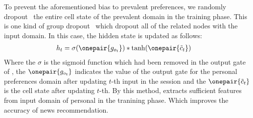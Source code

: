 To prevent the aforementioned bias to prevalent preferences, we randomly dropout~\cite{Dropout} the entire cell state of the prevalent domain in the training phase.
This is one kind of group dropout~\cite{GroupDropout} which dropout all of the related nodes with the input domain.
In this case, the hidden state is updated as follows:
\begin{align*}
	h_t &= \sigma(\onepair{g_{o_t}})*\tanh(\onepair{\tilde{c}_t})
\end{align*}
Where the $\sigma$ is the sigmoid function which had been removed in the output gate of \methodname, the $\onepair{g_{o_t}}$ indicates the value of the output gate for the personal preferences domain after updating $t$-th input in the session and the $\onepair{\tilde{c}_t}$ is the cell state after updating $t$-th.
By this method, \method extracts sufficient features from input domain of personal in the tranining phase.
Which improves the accuracy of news recommendation.

